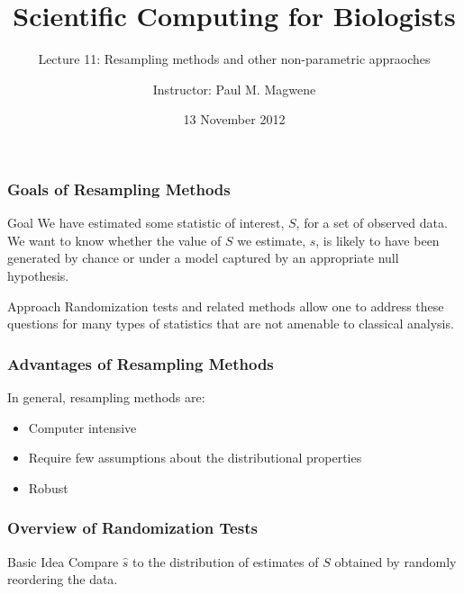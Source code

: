 \documentclass{beamer}
\title{Scientific Computing for Biologists}
\subtitle{Lecture 11: Resampling methods and other non-parametric appraoches} %
\author{Instructor: Paul M. Magwene}
\date{13 November 2012}
\begin{document}
\begin{frame}
\titlepage
\end{frame}



\begin{frame}
  \frametitle{Goals of Resampling Methods}

\begin{block}{Goal}
We have estimated some statistic of interest, $S$, for a set of observed data. We want to know whether the value of $S$ we estimate, $\widehat{s}$, is likely to have been generated by chance or under a model captured by an appropriate null hypothesis.
\end{block}


\begin{block}{Approach}
Randomization tests and related methods allow one to address these questions for many types of statistics that are not amenable to classical analysis.
\end{block}



\end{frame}


\begin{frame}
  \frametitle{Advantages of Resampling Methods}


In general, resampling methods are:
\begin{itemize}
    \item Computer intensive
    \item Require few assumptions about the distributional properties
    \item Robust
\end{itemize}

\end{frame}

\begin{frame}
  \frametitle{Overview of Randomization Tests}

\begin{block}{Basic Idea}
Compare $\widehat{s}$ to the distribution of estimates of $S$ obtained by randomly reordering the data.
\end{block}

\end{frame}
\end{document}
